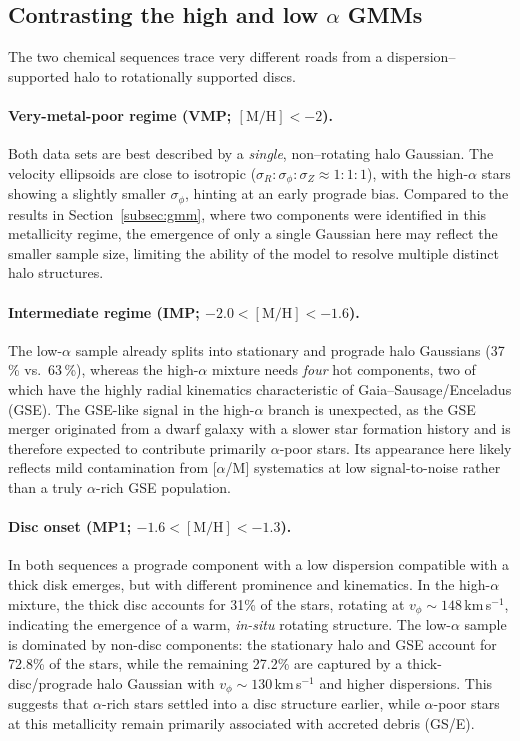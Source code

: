 \documentclass[a4paper,12pt]{article}
\begin{document}
\subsection{\texorpdfstring{Contrasting the high and low $\alpha$ GMMs}{Contrasting the high/low–alpha GMMs}}
\label{subsec:gmm_comparison}

The two chemical sequences trace very different roads from a dispersion–supported halo to
rotationally supported discs.

\paragraph{Very-metal-poor regime (VMP; $[\mathrm{M/H}]<-2$).}
Both data sets are best described by a \emph{single}, non–rotating halo Gaussian.
The velocity ellipsoids are close to isotropic
($\sigma_{R}\!:\!\sigma_{\phi}\!:\!\sigma_{Z}\!\approx\!1\!:\!1\!:\!1$),
with the high-$\alpha$ stars showing a slightly smaller
$\sigma_{\phi}$, hinting at an early prograde bias.
Compared to the results in Section~\ref{subsec:gmm}, where two components were
 identified in this metallicity regime, the emergence of only a single Gaussian 
 here may reflect the smaller sample size, limiting the ability of the model to 
 resolve multiple distinct halo structures.


\paragraph{Intermediate regime (IMP; $-2.0<[\mathrm{M/H}]<-1.6$).}
The low-$\alpha$ sample already splits into stationary and prograde halo
Gaussians (37\,\% vs.\ 63\,\%), whereas the high-$\alpha$ mixture needs
\textit{four} hot components, two of which have the highly radial kinematics
characteristic of Gaia–Sausage/Enceladus (GSE).
The GSE-like signal in the high-$\alpha$ branch is unexpected, as the GSE merger
originated from a dwarf galaxy with a slower star formation history and is 
therefore expected to contribute primarily $\alpha$-poor stars. 
Its appearance here likely reflects mild contamination from \mbox{[$\alpha$/M]} 
systematics at low signal-to-noise rather than a truly $\alpha$-rich GSE population.


\paragraph{Disc onset (MP1; $-1.6<[\mathrm{M/H}]<-1.3$).}
In both sequences a prograde component with a low dispersion compatible with a thick disk emerges, 
but with different prominence and kinematics.  
In the high-$\alpha$ mixture, the thick disc accounts for 31\% of the stars, rotating at 
$v_{\phi}\!\sim\!148$\,km\,s$^{-1}$, indicating the emergence of a warm, 
\textit{in-situ} rotating structure.  
The low-$\alpha$ sample is dominated by non-disc components: the stationary halo and GSE account for 72.8\% 
of the stars, while the remaining 27.2\% are captured by a thick-disc/prograde halo Gaussian with 
$v_{\phi}\!\sim\!130$\,km\,s$^{-1}$ and higher dispersions.  
This suggests that $\alpha$-rich stars settled into a disc structure earlier, while $\alpha$-poor stars at this 
metallicity remain primarily associated with accreted debris (GS/E).
\end{document}
